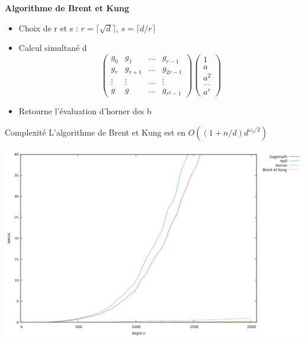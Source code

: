 \documentclass[10pt,a4paper]{beamer}
\begin{document}
\begin{frame}
    \textbf{Algorithme de Brent et Kung}
    \begin{itemize}
        \item Choix de r et s : $r = \lceil \sqrt{d} \rceil$, $s = \lceil d/r \rceil$ 
        \item Calcul simultané d
            \[
            \begin{pmatrix}
                g_0&g_1&...&g_{r-1} \\
                g_r&g_{r+1}&...&g_{2r-1} \\
                \vdots&\vdots&...&\vdots \\
                g_{}&g_{}&...&g_{r^2-1}
            \end{pmatrix}
            \begin{pmatrix}
                1 \\
                a \\
                a^2 \\
                ... \\
                a^r
            \end{pmatrix}
            \]
        \item Retourne l'évaluation d'horner des b
    \end{itemize}

    \begin{alertblock}{Complexité}
        L'algorithme de Brent et Kung est en $O((1+n/d)d^{\omega_2/2})$
    \end{alertblock}
\end{frame}

\begin{frame}
    \includegraphics[width=1\linewidth]{comp.png}
\end{frame}
\end{document}
